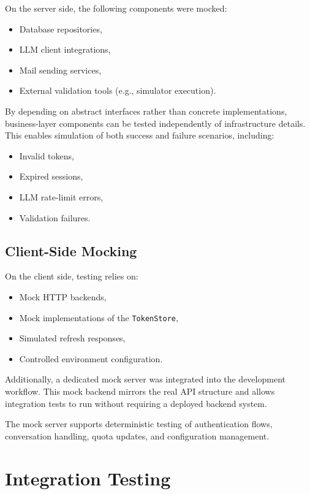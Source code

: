 On the server side, the following components were mocked:

\begin{itemize}
    \item Database repositories,
    \item LLM client integrations,
    \item Mail sending services,
    \item External validation tools (e.g., simulator execution).
\end{itemize}

By depending on abstract interfaces rather than concrete implementations, business-layer components can be tested independently of infrastructure details. This enables simulation of both success and failure scenarios, including:

\begin{itemize}
    \item Invalid tokens,
    \item Expired sessions,
    \item LLM rate-limit errors,
    \item Validation failures.
\end{itemize}

\subsection{Client-Side Mocking}

On the client side, testing relies on:

\begin{itemize}
    \item Mock HTTP backends,
    \item Mock implementations of the \texttt{TokenStore},
    \item Simulated refresh responses,
    \item Controlled environment configuration.
\end{itemize}

Additionally, a dedicated mock server was integrated into the development workflow. This mock backend mirrors the real API structure and allows integration tests to run without requiring a deployed backend system.

The mock server supports deterministic testing of authentication flows, conversation handling, quota updates, and configuration management.

\section{Integration Testing}

